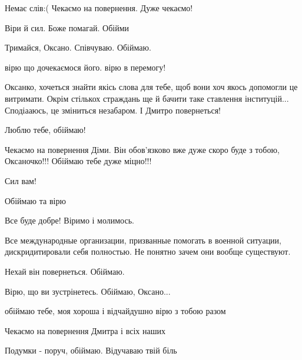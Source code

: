 
Немає слів:( Чекаємо на повернення. Дуже чекаємо!


Віри й сил.
Боже помагай.
Обійми


Тримайся, Оксано. Співчуваю. Обіймаю.


вірю що дочекаємося його. вірю в перемогу!


Оксанко, хочеться знайти якісь слова для тебе, щоб вони хоч якось допомогли це
витримати. Окрім стількох страждань ще й бачити таке ставлення інституцій...
Сподіааюсь, це зміниться незабаром. І Дмитро повернеться!

Люблю тебе, обіймаю!


Чекаємо на повернення Діми. Він обов'язково вже дуже скоро буде з тобою, Оксаночко!!! Обіймаю тебе дуже міцно!!!


Сил вам!


Обіймаю та вірю


Все буде добре! Віримо і молимось.


Все международные организации, призванные помогать в военной ситуации,
дискридитировали себя полностью. Не понятно зачем они вообще существуют.


Нехай він повернеться. Обіймаю.


Вірю, що ви зустрінетесь. Обіймаю, Оксано...


обіймаю тебе, моя хороша і відчайдушно вірю з тобою разом


Чекаємо на повернення Дмитра і всіх наших


Подумки - поруч, обіймаю. Відучаваю твій біль


